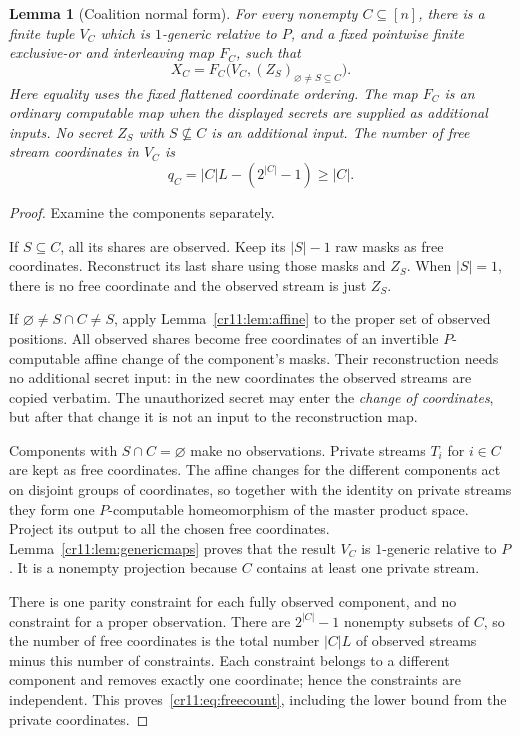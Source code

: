 \documentclass[11pt,letterpaper]{article}
\theoremstyle{plain}
\newtheorem{lemma}[theorem]{Lemma}
\theoremstyle{definition}
\theoremstyle{remark}
\numberwithin{equation}{section}
\begin{document}
\begin{lemma}[Coalition normal form]\label{cr11:lem:normalform}
For every nonempty $C\subseteq[n]$, there is a finite tuple $V_C$ which is
$1$-generic relative to $P$, and a fixed pointwise finite exclusive-or and
interleaving map $F_C$, such that
\begin{equation}\label{cr11:eq:normalform}
       X_C=F_C\bigl(V_C,(Z_S)_{\varnothing\ne S\subseteq C}\bigr).
\end{equation}
Here equality uses the fixed flattened coordinate ordering. The map $F_C$
is an ordinary computable map when the displayed secrets are supplied as
additional inputs. No secret $Z_S$ with $S\nsubseteq C$ is an additional
input. The number of free stream coordinates in $V_C$ is
\begin{equation}\label{cr11:eq:freecount}
                  q_C=|C|L-(2^{|C|}-1)\geq |C|.
\end{equation}
\end{lemma}
\begin{proof}
Examine the components separately.

If $S\subseteq C$, all its shares are observed. Keep its $|S|-1$ raw masks
as free coordinates. Reconstruct its last share using those masks and
$Z_S$. When $|S|=1$, there is no free coordinate and the observed stream is
just $Z_S$.

If $\varnothing\ne S\cap C\ne S$, apply Lemma~\ref{cr11:lem:affine} to the
proper set of observed positions. All observed shares become free
coordinates of an invertible $P$-computable affine change of the component's
masks. Their reconstruction needs no additional secret input: in the new
coordinates the observed streams are copied verbatim. The unauthorized
secret may enter the \emph{change of coordinates}, but after that change it
is not an input to the reconstruction map.

Components with $S\cap C=\varnothing$ make no observations. Private streams
$T_i$ for $i\in C$ are kept as free coordinates. The affine changes for the
different components act on disjoint groups of coordinates, so together
with the identity on private streams they form one $P$-computable
homeomorphism of the master product space. Project its output to all the
chosen free coordinates. Lemma~\ref{cr11:lem:genericmaps} proves that the result
$V_C$ is $1$-generic relative to $P$. It is a nonempty projection because
$C$ contains at least one private stream.

There is one parity constraint for each fully observed component, and no
constraint for a proper observation. There are $2^{|C|}-1$ nonempty subsets
of $C$, so the number of free coordinates is the total number $|C|L$ of
observed streams minus this number of constraints. Each constraint belongs
to a different component and removes exactly one coordinate; hence the
constraints are independent. This proves~\eqref{cr11:eq:freecount}, including
the lower bound from the private coordinates.
\end{proof}
\end{document}
